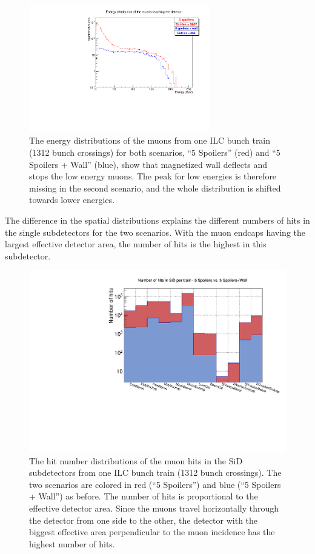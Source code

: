 \begin{figure}
    \centering
    \includegraphics[width=0.7\textwidth]{figures/muon_energy.pdf}
    \caption[Energy distribution of muons from the two shielding scenarios]{
    The energy distributions of the muons from one ILC bunch train (1312 bunch crossings) for both scenarios, ``5 Spoilers'' (red) and ``5 Spoilers + Wall'' (blue), show that magnetized wall deflects and stops the low energy muons.
    The peak for low energies is therefore missing in the second scenario, and the whole distribution is shifted towards lower energies.
    }
    \label{fig:muon_energy}
\end{figure}

The difference in the spatial distributions explains the different numbers of hits in the single subdetectors for the two scenarios.
With the muon endcaps having the largest effective detector area, the number of hits is the highest in this subdetector.

\begin{figure}
    \centering
    \includegraphics[width=\textwidth]{figures/Hits_in_SiD_subdetectors_MuonSpoilerStudy.pdf}
    \caption[Hit number distribution in the SiD subdetectors]{
    The hit number distributions of the muon hits in the SiD subdetectors from one ILC bunch train (1312 bunch crossings).
    The two scenarios are colored in red (``5 Spoilers'') and blue (``5 Spoilers + Wall'') as before.
    The number of hits is proportional to the effective detector area.
    Since the muons travel horizontally through the detector from one side to the other, the detector with the biggest effective area perpendicular to the muon incidence has the highest number of hits.
    }
    \label{fig:hit_distribution}
\end{figure}

